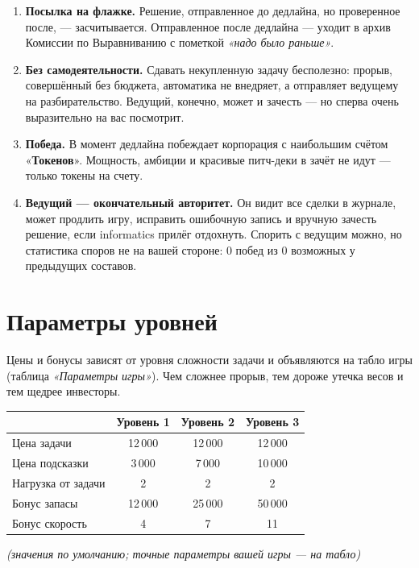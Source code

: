 \documentclass[12pt,a4paper]{article}
\newcommand{\term}[1]{«\textbf{#1}»}
\begin{document}
\begin{enumerate}[leftmargin=1.6em,itemsep=2pt]
\item \textbf{Посылка на флажке.} Решение, отправленное до дедлайна,
но проверенное после, --- засчитывается. Отправленное после дедлайна ---
уходит в архив Комиссии по Выравниванию с пометкой
\emph{«надо было раньше»}.

\item \textbf{Без самодеятельности.} Сдавать некупленную задачу
бесполезно: прорыв, совершённый без бюджета, автоматика не внедряет,
а отправляет ведущему на разбирательство. Ведущий, конечно, может
и зачесть --- но сперва очень выразительно на вас посмотрит.

\item \textbf{Победа.} В момент дедлайна побеждает корпорация
с наибольшим счётом \term{Токенов}. Мощность, амбиции и красивые
питч-деки в зачёт не идут --- только токены на счету.

\item \textbf{Ведущий --- окончательный авторитет.} Он видит все сделки
в журнале, может продлить игру, исправить ошибочную запись и вручную
зачесть решение, если informatics прилёг отдохнуть. Спорить с ведущим
можно, но статистика споров не на вашей стороне: 0 побед из 0 возможных
у предыдущих составов.

\end{enumerate}

\section*{Параметры уровней}

Цены и бонусы зависят от уровня сложности задачи и объявляются
на табло игры (таблица \emph{«Параметры игры»}). Чем сложнее прорыв,
тем дороже утечка весов и тем щедрее инвесторы.

\begin{center}
\begin{tabular}{lccc}
\toprule
 & \textbf{Уровень 1} & \textbf{Уровень 2} & \textbf{Уровень 3} \\
\midrule
Цена задачи        & 12\,000 & 12\,000 & 12\,000 \\
Цена подсказки     & 3\,000  & 7\,000  & 10\,000 \\
Нагрузка от задачи & 2       & 2       & 2       \\
Бонус запасы       & 12\,000 & 25\,000 & 50\,000 \\
Бонус скорость     & 4       & 7       & 11      \\
\bottomrule
\end{tabular}

\small\emph{(значения по умолчанию; точные параметры вашей игры --- на табло)}
\end{center}
\end{document}
